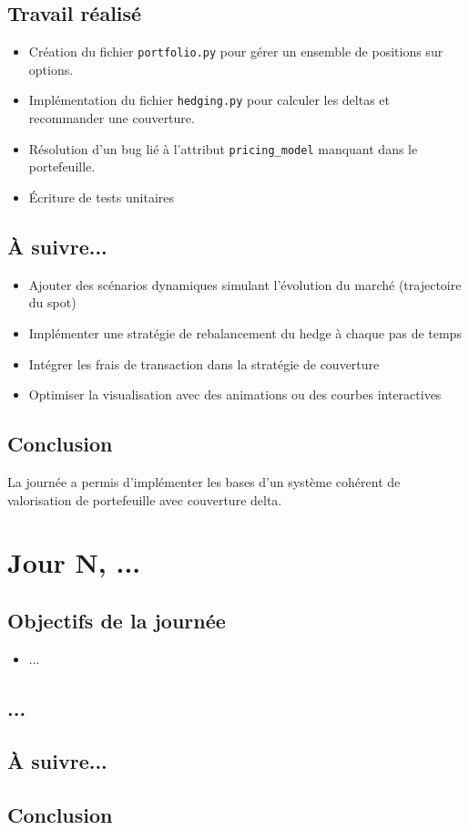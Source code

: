 \documentclass[a4paper,11pt]{article}
\begin{document}
\subsection{Travail réalisé}
\begin{itemize}
    \item Création du fichier \texttt{portfolio.py} pour gérer un ensemble de positions sur options.
    \item Implémentation du fichier \texttt{hedging.py} pour calculer les deltas et recommander une couverture.
    \item Résolution d’un bug lié à l’attribut \texttt{pricing\_model} manquant dans le portefeuille.
    \item Écriture de tests unitaires
\end{itemize}

\subsection{À suivre...}
\begin{itemize}
    \item Ajouter des scénarios dynamiques simulant l’évolution du marché (trajectoire du spot)
    \item Implémenter une stratégie de rebalancement du hedge à chaque pas de temps
    \item Intégrer les frais de transaction dans la stratégie de couverture
    \item Optimiser la visualisation avec des animations ou des courbes interactives
\end{itemize}

\subsection{Conclusion}
La journée a permis d’implémenter les bases d’un système cohérent de valorisation de portefeuille avec couverture delta.

\newpage


\section{Jour N, ...}
\subsection{Objectifs de la journée}
\begin{itemize}
    \item ...
\end{itemize}
\subsection{...}
\subsection{À suivre...}
\subsection{Conclusion}
\newpage

\end{document}

